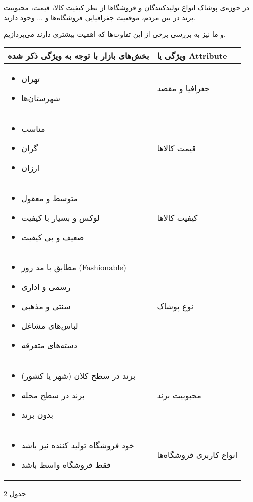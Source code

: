 \documentclass[]{article}
\begin{document}
در حوزه‌ی پوشاک انواع تولیدکنندگان و فروشگاها از نظر کیفیت کالا، قیمت،
محبوبیت برند در بین مردم، موقعیت جغرافیایی فروشگاه‌ها و ... وجود دارند.

و ما نیز به بررسی برخی از این تفاوت‌ها که اهمیت بیشتری دارند می‌پردازیم.

\begin{longtable}[]{@{}ll@{}}
\toprule
بخش‌های بازار با توجه به ویژگی ذکر شده & ویژگی یا
Attribute\tabularnewline
\midrule
\endhead
\begin{itemize}
\item
  تهران
\item
  شهرستان‌ها
\end{itemize} & جغرافیا و مقصد\tabularnewline
\begin{itemize}
\item
  مناسب
\item
  گران
\item
  ارزان
\end{itemize} & قیمت کالاها\tabularnewline
\begin{itemize}
\item
  متوسط و معقول
\item
  لوکس و بسیار با کیفیت
\item
  ضعیف و بی کیفیت
\end{itemize} & کیفیت کالاها\tabularnewline
\begin{itemize}
\item
  مطابق با مد روز (Fashionable)
\item
  رسمی و اداری
\item
  سنتی و مذهبی
\item
  لباس‌های مشاغل
\item
  دسته‌های متفرقه
\end{itemize} & نوع پوشاک\tabularnewline
\begin{itemize}
\item
  برند در سطح کلان (شهر یا کشور)
\item
  برند در سطح محله
\item
  بدون برند
\end{itemize} & محبوبیت برند\tabularnewline
\begin{itemize}
\item
  خود فروشگاه تولید کننده نیز باشد
\item
  فقط فروشگاه واسط باشد
\end{itemize} & انواع کاربری فروشگاه‌ها\tabularnewline
\bottomrule
\end{longtable}

جدول 2
\end{document}
